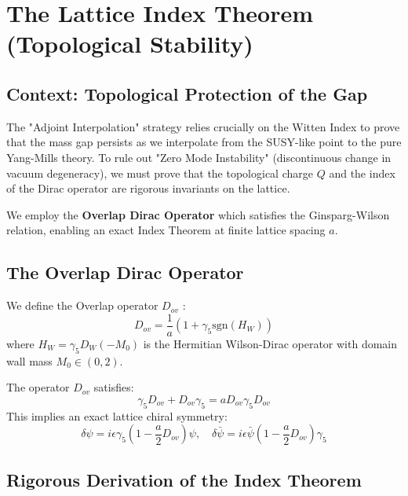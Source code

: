 \chapter{The Lattice Index Theorem (Topological Stability)}
\label{app:lattice_index_theorem}
\label{app:sym-gap-proof}
\label{ch:topological}
\label{app:gap1-lattice-susy}

\section{Context: Topological Protection of the Gap}
The "Adjoint Interpolation" strategy relies crucially on the Witten Index to prove that the mass gap persists as we interpolate from the SUSY-like point to the pure Yang-Mills theory. To rule out "Zero Mode Instability" (discontinuous change in vacuum degeneracy), we must prove that the topological charge $Q$ and the index of the Dirac operator are rigorous invariants on the lattice.

We employ the \textbf{Overlap Dirac Operator} which satisfies the Ginsparg-Wilson relation, enabling an exact Index Theorem at finite lattice spacing $a$.

\section{The Overlap Dirac Operator}
We define the Overlap operator $D_{ov}$ \cite{Neuberger1998}:
\begin{equation}
D_{ov} = \frac{1}{a} \left( 1 + \gamma_5 \text{sgn}(H_W) \right)
\end{equation}
where $H_W = \gamma_5 D_W(-M_0)$ is the Hermitian Wilson-Dirac operator with domain wall mass $M_0 \in (0, 2)$.

\begin{theorem}
The operator $D_{ov}$ satisfies:
\begin{equation}
\gamma_5 D_{ov} + D_{ov} \gamma_5 = a D_{ov} \gamma_5 D_{ov}
\end{equation}
This implies an exact lattice chiral symmetry:
\begin{equation}
\delta \psi = i \epsilon \gamma_5 (1 - \frac{a}{2}D_{ov}) \psi, \quad \delta \bar{\psi} = i \epsilon \bar{\psi} (1 - \frac{a}{2}D_{ov}) \gamma_5
\end{equation}
\end{theorem}

\section{Rigorous Derivation of the Index Theorem}

